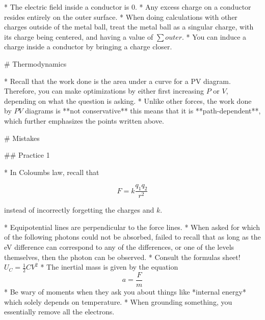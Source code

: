 \documentclass{article}
\begin{document}
\begin{markdown}
* The electric field inside a conductor is $0$.
* Any excess charge on a conductor resides entirely on the outer surface.
* When doing calculations with other charges outside of the metal ball, treat the metal ball as a singular charge, with its charge being centered, and having a value of $\sum outer$.
* You can induce a charge inside a conductor by bringing a charge closer. 

# Thermodynamics

* Recall that the work done is the area under a curve for a PV diagram. Therefore, you can make optimizations by either first increasing $P$ or $V$, depending on what the question is asking.
* Unlike other forces, the work done by $PV$ diagrams is **not conservative** this means that it is **path-dependent**, which further emphasizes the points written above.

# Mistakes

## Practice 1

* In Coloumbs law, recall that

\end{markdown}

$$
F = k\frac{q_1 q_2}{r^2}
$$

\begin{markdown}

instead of incorrectly forgetting the charges and $k$.

* Equipotential lines are perpendicular to the force lines.
* When asked for which of the following photons could not be absorbed, failed to recall that as long as the eV difference can correspond to any of the differences, or one of the levels themselves, then the photon can be observed.
* Consult the formulas sheet! $U_C = \frac{1}{2}CV^2$
* The inertial mass is given by the equation $$a = \frac{F}{m}$$
* Be wary of moments when they ask you about things like *internal energy* which solely depends on temperature.
* When grounding something, you essentially remove all the electrons.

\end{markdown}
\end{document}
